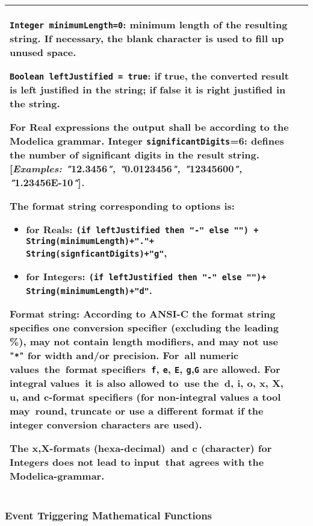 \begin{longtable}{|p{4.5cm}|p{10cm}|}
\lstinline[basicstyle=\ttfamily]!Integer minimumLength=0!: minimum length of the resulting string. If
necessary, the blank character is used to fill up unused space.

\lstinline[basicstyle=\ttfamily]!Boolean leftJustified = true!: if true, the converted result is left
justified in the string; if false it is right justified in the string.

For Real expressions the output shall be according to the Modelica
grammar. Integer \lstinline[basicstyle=\ttfamily]!significantDigits!=6: defines the number of significant
digits in the result string. {[}\emph{Examples: "}12.3456\emph{",
"}0.0123456\emph{", "}12345600\emph{", "}1.23456E-10\emph{"}{]}\emph{.}

The format string corresponding to options is:

\begin{itemize}
\item
  for Reals: %
  \lstinline[basicstyle=\ttfamily]!(if leftJustified then "-" else "") +  String(minimumLength)+"."+ String(signficantDigits)+"g"!,
\item
  for Integers: %
  \lstinline[basicstyle=\ttfamily]!(if leftJustified then "-" else "")+ String(minimumLength)+"d"!.
\end{itemize}

Format string: According to ANSI-C the format string specifies one
conversion specifier (excluding the leading \%), may not contain length
modifiers, and may not use "\lstinline[basicstyle=\ttfamily]!*!" for width and/or precision. For~all
numeric values~the~format specifiers~\lstinline[basicstyle=\ttfamily]!f!, \lstinline[basicstyle=\ttfamily]!e!, \lstinline[basicstyle=\ttfamily]!E!, \lstinline[basicstyle=\ttfamily]!g!,\lstinline[basicstyle=\ttfamily]!G! are allowed. For
integral values~it is also allowed to~use the~d, i, o, x, X, u, and
c-format specifiers (for non-integral values a tool may~round, truncate
or use a different format if the integer conversion characters are
used).

The x,X-formats (hexa-decimal)~and c (character) for Integers does not
lead to input~that agrees with the Modelica-grammar.\\ \hline
\end{longtable}

\subsubsection{Event Triggering Mathematical Functions}

